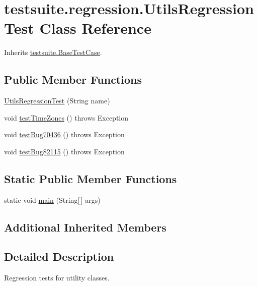\hypertarget{classtestsuite_1_1regression_1_1_utils_regression_test}{}\section{testsuite.\+regression.\+Utils\+Regression\+Test Class Reference}
\label{classtestsuite_1_1regression_1_1_utils_regression_test}


Inherits \mbox{\hyperlink{classtestsuite_1_1_base_test_case}{testsuite.\+Base\+Test\+Case}}.

\subsection*{Public Member Functions}
\begin{DoxyCompactItemize}
\item 
\mbox{\hyperlink{classtestsuite_1_1regression_1_1_utils_regression_test_a5c82c7a08235cbe185d04d950a5d9102}{Utils\+Regression\+Test}} (String name)
\item 
void \mbox{\hyperlink{classtestsuite_1_1regression_1_1_utils_regression_test_a23afa0e1c5288ab757fb3e4c09676f79}{test\+Time\+Zones}} ()  throws Exception 
\item 
void \mbox{\hyperlink{classtestsuite_1_1regression_1_1_utils_regression_test_a29ccb38cafacb3d15f1610080cdc2d8a}{test\+Bug70436}} ()  throws Exception 
\item 
void \mbox{\hyperlink{classtestsuite_1_1regression_1_1_utils_regression_test_a47cc76ff1bb97ee0755b21950e5387d0}{test\+Bug82115}} ()  throws Exception 
\end{DoxyCompactItemize}
\subsection*{Static Public Member Functions}
\begin{DoxyCompactItemize}
\item 
static void \mbox{\hyperlink{classtestsuite_1_1regression_1_1_utils_regression_test_a85edc67e921fc1bae46d247aa21bdfaf}{main}} (String\mbox{[}$\,$\mbox{]} args)
\end{DoxyCompactItemize}
\subsection*{Additional Inherited Members}


\subsection{Detailed Description}
Regression tests for utility classes. 

